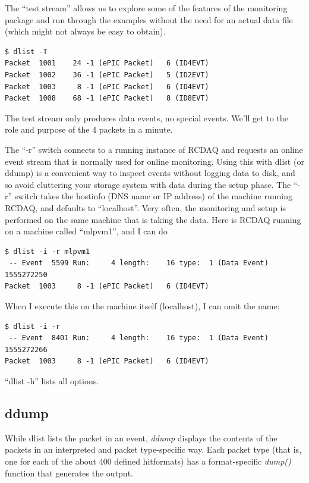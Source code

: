 \documentclass{article}[11pt]
\begin{document}
The ``test stream'' allows us to explore some of the features of the
monitoring package and run through the examples without the need for
an actual data file (which might not always be easy to obtain).

\begin{verbatim}
$ dlist -T
Packet  1001    24 -1 (ePIC Packet)   6 (ID4EVT)
Packet  1002    36 -1 (ePIC Packet)   5 (ID2EVT)
Packet  1003     8 -1 (ePIC Packet)   6 (ID4EVT)
Packet  1008    68 -1 (ePIC Packet)   8 (ID8EVT)
\end{verbatim}

The test stream only produces data events, no special events. We'll
get to the role and purpose of the 4 packets in a minute.

The ``-r'' switch connects to a running instance of RCDAQ and requests
an online event stream that is normally used for online
monitoring. Using this with dlist (or ddump) is a convenient way to
inspect events without logging data to disk, and so avoid cluttering
your storage system with data during the setup phase. The ``-r''
switch takes the hostinfo (DNS name or IP address) of the machine
running RCDAQ, and defaults to ``localhost''. Very often, the
monitoring and setup is performed on the same machine that is taking
the data. Here is RCDAQ running on a machine called ``mlpvm1'', and I
can do

\begin{verbatim}
$ dlist -i -r mlpvm1
 -- Event  5599 Run:     4 length:    16 type:  1 (Data Event)  1555272250
Packet  1003     8 -1 (ePIC Packet)   6 (ID4EVT)
\end{verbatim}

When I execute this on the machine itself (localhost), I can omit the name:

\begin{verbatim}
$ dlist -i -r
 -- Event  8401 Run:     4 length:    16 type:  1 (Data Event)  1555272266
Packet  1003     8 -1 (ePIC Packet)   6 (ID4EVT)
\end{verbatim}

``dlist -h'' lists all options.


\subsection{ddump}

While dlist lists the packet in an event, \emph{ddump} displays the
contents of the packets in an interpreted and packet type-specific
way. Each packet type (that is, one for each of the about 400 defined
hitformats) has a format-specific \emph{dump()} function that
generates the output.  
\end{document}
